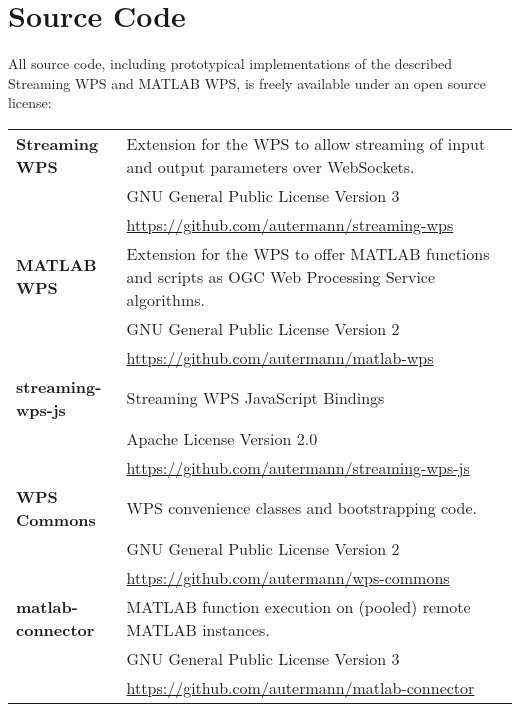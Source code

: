 
\chapter{Source Code}

All source code, including prototypical implementations of the described Streaming WPS and MATLAB WPS, is freely available under an open source license:
\begin{center}
	\begin{small}
	  \begin{tabularx}{\linewidth}{@{}lX@{}}
	  \toprule
	    \textbf{Streaming WPS}
	    & Extension for the \ftn WPS to allow streaming of input and output parameters over WebSockets.\\
	    & GNU General Public License Version 3\\
	    & \url{https://github.com/autermann/streaming-wps} \\
	    \cmidrule(r){1-1}
	    \cmidrule(l){2-2}

	    \textbf{MATLAB WPS}
	    & Extension for the \ftn WPS to offer MATLAB functions and scripts as OGC Web Processing Service algorithms.\\
	    & GNU General Public License Version 2\\
	    & \url{https://github.com/autermann/matlab-wps}\\
	    \cmidrule(r){1-1}
	    \cmidrule(l){2-2}

	    \textbf{streaming-wps-js}
	    & Streaming WPS JavaScript Bindings\\
	    & Apache License Version 2.0\\
	    & \url{https://github.com/autermann/streaming-wps-js}\\
	    \cmidrule(r){1-1}
	    \cmidrule(l){2-2}

	    \textbf{WPS Commons}
	    & \ftn WPS convenience classes and bootstrapping code.\\
	    & GNU General Public License Version 2\\
	    & \url{https://github.com/autermann/wps-commons}\\
	    \cmidrule(r){1-1}
	    \cmidrule(l){2-2}

	    \textbf{matlab-connector}
	    & MATLAB function execution on (pooled) remote MATLAB instances.\\
	    & GNU General Public License Version 3\\
	    & \url{https://github.com/autermann/matlab-connector}\\
	    \cmidrule(r){1-1}
	    \cmidrule(l){2-2}


\end{tabularx}
\end{small}
\end{center}
